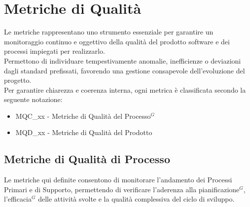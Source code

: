 \section{Metriche di Qualità}
\label{sec:metriche-qualita}
Le metriche rappresentano uno strumento essenziale per garantire un monitoraggio continuo e oggettivo della qualità del prodotto software e dei processi impiegati per realizzarlo.\\
Permettono di individuare tempestivamente anomalie, inefficienze o deviazioni dagli standard prefissati, favorendo una gestione consapevole dell’evoluzione del progetto.\\
Per garantire chiarezza e coerenza interna, ogni metrica è classificata secondo la seguente notazione:
\begin{itemize}
    \item MQC\_xx - Metriche di Qualità del Processo$^G$
    \item MQD\_xx - Metriche di Qualità del Prodotto
\end{itemize}

\subsection{Metriche di Qualità di Processo}
Le metriche qui definite consentono di monitorare l’andamento dei Processi Primari e di Supporto, permettendo di verificare l’aderenza alla pianificazione$^G$, l’efficacia$^G$ delle attività svolte e la qualità complessiva del ciclo di sviluppo.
